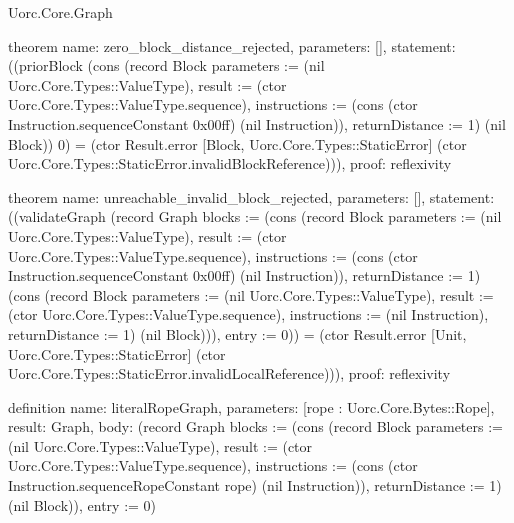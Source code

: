 \begin{lexlean}{Uorc.Core.Graph}
\begin{semanticmodule}
theorem{
  name: zero_block_distance_rejected,
  parameters: [],
  statement: ((priorBlock (cons (record Block {parameters := (nil Uorc.Core.Types::ValueType), result := (ctor Uorc.Core.Types::ValueType.sequence), instructions := (cons (ctor Instruction.sequenceConstant 0x00ff) (nil Instruction)), returnDistance := 1}) (nil Block)) 0) = (ctor Result.error [Block, Uorc.Core.Types::StaticError] (ctor Uorc.Core.Types::StaticError.invalidBlockReference))),
  proof: reflexivity{}
}

theorem{
  name: unreachable_invalid_block_rejected,
  parameters: [],
  statement: ((validateGraph (record Graph {blocks := (cons (record Block {parameters := (nil Uorc.Core.Types::ValueType), result := (ctor Uorc.Core.Types::ValueType.sequence), instructions := (cons (ctor Instruction.sequenceConstant 0x00ff) (nil Instruction)), returnDistance := 1}) (cons (record Block {parameters := (nil Uorc.Core.Types::ValueType), result := (ctor Uorc.Core.Types::ValueType.sequence), instructions := (nil Instruction), returnDistance := 1}) (nil Block))), entry := 0})) = (ctor Result.error [Unit, Uorc.Core.Types::StaticError] (ctor Uorc.Core.Types::StaticError.invalidLocalReference))),
  proof: reflexivity{}
}

definition{
  name: literalRopeGraph,
  parameters: [rope : Uorc.Core.Bytes::Rope],
  result: Graph,
  body: (record Graph {blocks := (cons (record Block {parameters := (nil Uorc.Core.Types::ValueType), result := (ctor Uorc.Core.Types::ValueType.sequence), instructions := (cons (ctor Instruction.sequenceRopeConstant rope) (nil Instruction)), returnDistance := 1}) (nil Block)), entry := 0})
}
\end{semanticmodule}
\end{lexlean}
